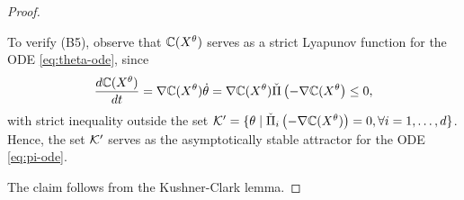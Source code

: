 \begin{proof}
\begin{inparaenum}[$\bullet$]
\item To verify (B5), observe that $\mathbb{C}(X^{\theta})$ serves as a strict Lyapunov function for the ODE \eqref{eq:theta-ode}, since
$$ \dfrac{d \mathbb{C}(X^{\theta})}{dt} = \nabla \mathbb{C}(X^{\theta}) \dot \theta = \nabla \mathbb{C}(X^{\theta}) \check\Pi \left(-\nabla \mathbb{C}(X^{\theta}\right) \le 0,$$
with strict inequality outside the set $\mathcal{K}' = \{\theta \mid \check\Pi_{i} \left(-\nabla \mathbb{C}(X^{\theta})\right)=0, \forall i=1,\ldots,d\}$. Hence, the set $\mathcal{K}'$ serves as the asymptotically stable attractor for the ODE \eqref{eq:pi-ode}.
\end{inparaenum} 
The claim follows from the Kushner-Clark lemma.
\end{proof}
% 
% 

